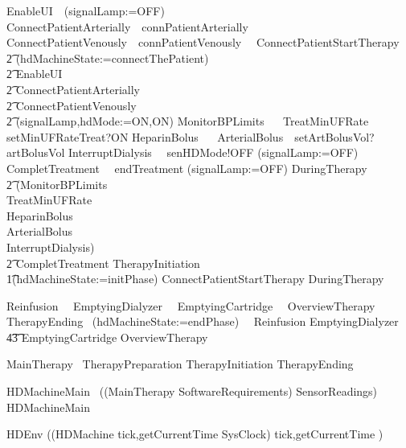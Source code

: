 \begin{circus}
  EnableUI~\circdef~(signalLamp:=OFF)
  ConnectPatientArterially~\circdef~connPatientArterially~\then~\Skip
  ConnectPatientVenously~\circdef~connPatientVenously~\then~\Skip
  ConnectPatientStartTherapy~\circdef~
    \\\t2 (hdMachineState:=connectThePatient) \circseq
    \\\t2 EnableUI \circseq
    \\\t2 ConnectPatientArterially \circseq
    \\\t2 ConnectPatientVenously \circseq
    \\\t2 (signalLamp,hdMode:=ON,ON)
  MonitorBPLimits ~\circdef~\Skip
  TreatMinUFRate ~\circdef~ setMinUFRateTreat?ON \then \Skip
  HeparinBolus ~\circdef~\Skip
  ArterialBolus~\circdef~setArtBolusVol?artBolusVol \then \Skip
  InterruptDialysis~\circdef~ senHDMode!OFF \then (signalLamp:=OFF)
  CompletTreatment~\circdef~ endTreatment \then (signalLamp:=OFF)
  DuringTherapy~\circdef~
        \\\t2 (MonitorBPLimits\\
              \interleave TreatMinUFRate\\
              \interleave HeparinBolus\\
              \interleave ArterialBolus\\
              \interleave InterruptDialysis) \circseq
        \\\t2 CompletTreatment
  TherapyInitiation~\circdef
  \\\t1(hdMachineState:=initPhase) \circseq ConnectPatientStartTherapy
    \circseq DuringTherapy

  Reinfusion~\circdef~\Skip
  EmptyingDialyzer~\circdef~ \Skip
  EmptyingCartridge~\circdef~\Skip
  OverviewTherapy~\circdef~\Skip
  TherapyEnding~\circdef
    (hdMachineState:=endPhase)~\circseq~ Reinfusion
    \circseq EmptyingDialyzer
    \circseq \\\t4\t3 EmptyingCartridge
    \circseq OverviewTherapy

  MainTherapy~\circdef
    TherapyPreparation
    \circseq TherapyInitiation
    \circseq TherapyEnding

  HDMachineMain~\circdef %
  ((MainTherapy
          \interleave  SoftwareRequirements)
          \interleave SensorReadings)
  \circspot HDMachineMain
  \circend
\end{circus}
\begin{circus}
\circprocess HDEnv \circdef ((HDMachine \lpar \lchanset tick,getCurrentTime \rchanset \rpar SysClock) \circhide \lchanset tick,getCurrentTime \rchanset)
\end{circus}

